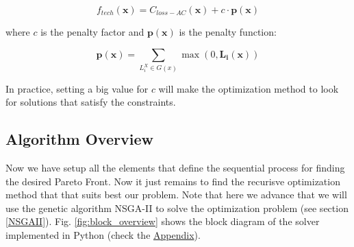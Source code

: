 \documentclass[a4paper,11pt, titlepage, twoside]{article}
\begin{document}
\begin{equation}
    f_{tech}(\mathbf{x}) = C_{loss-AC}(\mathbf{x}) + c \cdot \mathbf{p(x)}
\end{equation}

where $c$ is the penalty factor and $\mathbf{p(x)}$ is the penalty function:

\begin{equation}
    \mathbf{p(x)} = \sum_{L_i^X \in G(x)} \max(0, \mathbf{L_i(x)})
\end{equation}

In practice, setting a big value for $c$ will make the optimization method to look for solutions that satisfy the constraints.
\subsection{Algorithm Overview}

Now we have setup all the elements that define the sequential process for finding the desired Pareto Front. Now it just remains
to find the recurisve optimization method that that suits best our problem. Note that here we advance that we will use the genetic algorithm
NSGA-II to solve the optimization problem (see section \ref{NSGAII}). Fig. \ref{fig:block_overview} shows the block diagram of the solver implemented in Python (check the \hyperref[Appendix]{Appendix}).
\end{document}
